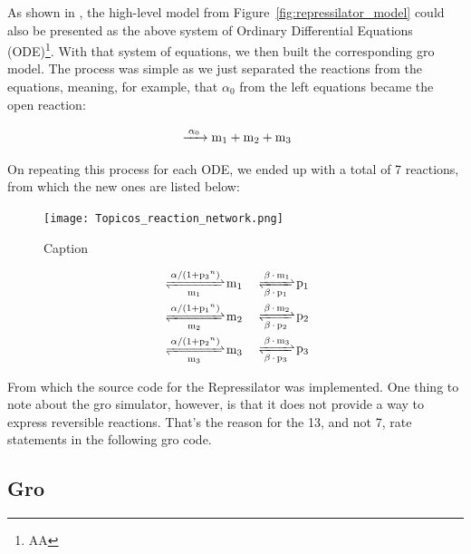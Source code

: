 \documentclass[12pt]{article}
\begin{document}
    As shown in \cite{Elowitz2000}, the high-level model from Figure~\ref{fig:repressilator_model} could also be presented as the above system of Ordinary Differential Equations (ODE)\footnote{AA}. With that system of equations, we then built the corresponding gro model. The process was simple as we just separated the reactions from the equations, meaning, for example, that $\alpha_{0}$ from the left equations became the open reaction:
    
    \begin{equation}
    \ce{ ->[\alpha_{0}] m_{1} + m_{2} + m_{3}}
    \end{equation}
    
    On repeating this process for each ODE, we ended up with a total of 7 reactions, from which the new ones are listed below:
    
    \begin{figure}[h]
        \centering
        \texttt{[image: Topicos\_reaction\_network.png]}
        \caption{Caption}
        \label{fig:my_label}
    \end{figure}
    
    \begin{equation}
    \begin{aligned}[c]
        \ce{ <=>[\alpha/(1 + p_{3}^n)][m_{1}] m_{1}} & & \\
        \ce{ <=>[\alpha/(1 + p_{1}^n)][m_{2}] m_{2}} & & \\
        \ce{ <=>[\alpha/(1 + p_{2}^n)][m_{3}] m_{3}} & &
    \end{aligned}
    \begin{aligned}[c]
        \ce{ <=>[\beta*m_{1}][\beta*p_{1}] p_{1}} \\
        \ce{ <=>[\beta*m_{2}][\beta*p_{2}] p_{2}} \\
        \ce{ <=>[\beta*m_{3}][\beta*p_{3}] p_{3}}
    \end{aligned}
    \end{equation}
    
    From which the source code for the Repressilator was implemented. One thing to note about the gro simulator, however, is that it does not provide a way to express reversible reactions. That's the reason for the 13, and not 7, rate statements in the following gro code.
    
    

\subsection{Gro}
    
\end{document}
